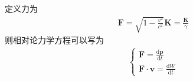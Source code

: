 \documentclass[main.tex]{subfiles}
\begin{document}
定义力为
\begin{align}
    \boldsymbol{F} = \sqrt{1 - \frac{v^2}{c^2}} \boldsymbol{K} = \frac{\boldsymbol{K}}{\gamma}
\end{align}
则相对论力学方程可以写为
\begin{align}
    \left\{\begin{array}{l}
         \boldsymbol{F} = \displaystyle \frac{\mathrm{d} \boldsymbol{p}} {\mathrm{d} t} \\
          \boldsymbol{F} \cdot \boldsymbol{v} = \displaystyle \frac{\mathrm{d} W} {\mathrm{d} t}
    \end{array}\right.
\end{align}
\end{document}
